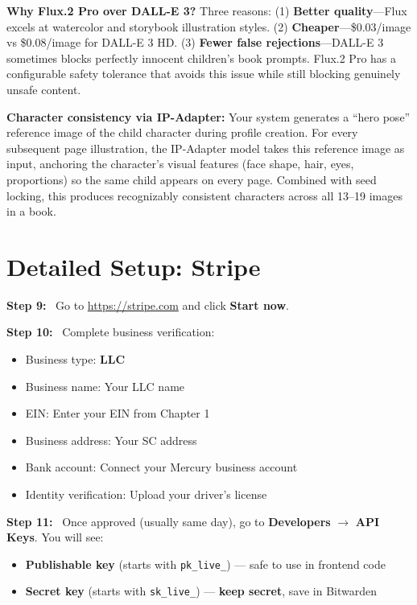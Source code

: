 \documentclass[12pt, letterpaper, oneside]{book}
\newcommand{\step}[1]{\noindent\textbf{\textcolor{primary}{Step #1:}}~}
\begin{document}
\begin{infobox}
\textbf{Why Flux.2 Pro over DALL-E 3?} Three reasons: (1) \textbf{Better quality}---Flux excels at watercolor and storybook illustration styles. (2) \textbf{Cheaper}---\$0.03/image vs \$0.08/image for DALL-E 3 HD. (3) \textbf{Fewer false rejections}---DALL-E 3 sometimes blocks perfectly innocent children's book prompts. Flux.2 Pro has a configurable safety tolerance that avoids this issue while still blocking genuinely unsafe content.
\end{infobox}

\begin{infobox}
\textbf{Character consistency via IP-Adapter:} Your system generates a ``hero pose'' reference image of the child character during profile creation. For every subsequent page illustration, the IP-Adapter model takes this reference image as input, anchoring the character's visual features (face shape, hair, eyes, proportions) so the same child appears on every page. Combined with seed locking, this produces recognizably consistent characters across all 13--19 images in a book.
\end{infobox}

\section{Detailed Setup: Stripe}

\step{9} Go to \url{https://stripe.com} and click \textbf{Start now}.

\step{10} Complete business verification:
\begin{itemize}[leftmargin=2em]
  \item Business type: \textbf{LLC}
  \item Business name: Your LLC name
  \item EIN: Enter your EIN from Chapter 1
  \item Business address: Your SC address
  \item Bank account: Connect your Mercury business account
  \item Identity verification: Upload your driver's license
\end{itemize}

\step{11} Once approved (usually same day), go to \textbf{Developers} $\rightarrow$ \textbf{API Keys}. You will see:
\begin{itemize}[leftmargin=2em]
  \item \textbf{Publishable key} (starts with \texttt{pk\_live\_}) --- safe to use in frontend code
  \item \textbf{Secret key} (starts with \texttt{sk\_live\_}) --- \textbf{keep secret}, save in Bitwarden
\end{itemize}
\end{document}
